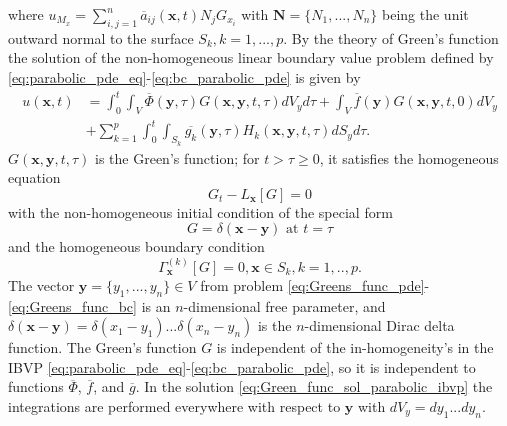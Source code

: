 \documentclass[\main/thesis.tex]{subfiles}
\begin{document}
where $u_{M_x} {=} \sum_{i, j {=} 1}^{n} \overline{a}_{ij}(\boldsymbol{x}, t) N_j G_{x_i}$ with 
$\boldsymbol{N} {=} \{ N_1, ..., N_n \}$ being the unit outward normal to the surface $S_k, k {=} 1, ..., p$.
By the theory of Green's function the solution of the non-homogeneous linear boundary value problem defined by 
\eqref{eq:parabolic_pde_eq}-\eqref{eq:bc_parabolic_pde} is given by
\begin{align}
u(\boldsymbol{x}, t) &{=} \int_{0}^{t} \int_V \overline{\Phi}(\boldsymbol{y}, \tau) G(\boldsymbol{x}, \boldsymbol{y}, t, \tau) dV_y d\tau
                     {+} \int_{V} \overline{f}(\boldsymbol{y}) G(\boldsymbol{x}, \boldsymbol{y}, t, 0) dV_y 
                     \label{eq:Green_func_sol_parabolic_ibvp} \\
                     &{+} \sum_{k{=}1}^{p} \int_{0}^{t} \int_{S_k} \overline{g_k}(\boldsymbol{y}, \tau) H_k(\boldsymbol{x}, \boldsymbol{y}, t, \tau) dS_y d\tau \nonumber.
\end{align}
$G(\boldsymbol{x}, \boldsymbol{y}, t, \tau)$ is the Green's function; for $t {>} \tau {\ge} 0$, it satisfies the homogeneous equation
\begin{equation}
G_t {-} L_{\boldsymbol{x}}[G] {=} 0
\label{eq:Greens_func_pde}
\end{equation}
with the non-homogeneous initial condition of the special form
\begin{equation}
G {=} \delta(\boldsymbol{x} {-} \boldsymbol{y}) \text{ at } t {=} \tau
\label{eq:Greens_func_ic}
\end{equation}
and the homogeneous boundary condition
\begin{equation}
\Gamma_{\boldsymbol{x}}^{(k)}[G] {=} 0, \boldsymbol{x} {\in} S_k, k {=} 1, .., p.
\label{eq:Greens_func_bc}
\end{equation}
The vector $\boldsymbol{y} {=} \{y_1, ..., y_n \} {\in} V$ from problem \eqref{eq:Greens_func_pde}-\eqref{eq:Greens_func_bc} is an\newline
$n$-dimensional free parameter, and $\delta(\boldsymbol{x} {-} \boldsymbol{y}) {=} \delta(x_1 {-} y_1)...\delta(x_n {-} y_n)$ is the\newline
$n$-dimensional Dirac delta function. The Green's function $G$ is independent of the in-homogeneity's in the IBVP 
\eqref{eq:parabolic_pde_eq}-\eqref{eq:bc_parabolic_pde}, so it is independent to functions $\overline{\Phi}$, $\overline{f}$, and $\overline{g}$.
In the solution \eqref{eq:Green_func_sol_parabolic_ibvp} the integrations are performed everywhere with respect to $\boldsymbol{y}$ with $dV_y {=} dy_1...dy_n$.
\end{document}
